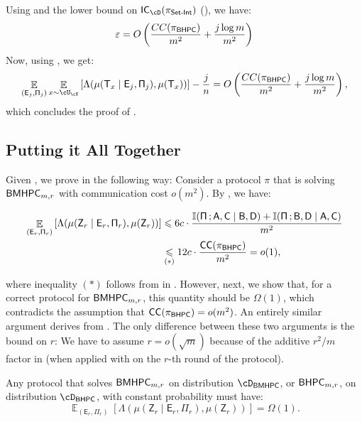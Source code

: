 \documentclass[11pt,letterpaper]{article}
\newcommand{\eps}{\varepsilon}
\DeclareMathOperator*{\E}{\mathbb{E}}
\renewcommand{\leq}{\leqslant}
\theoremstyle{definition}
\newcommand{\rPi}{\rv{\Pi}}
\DeclareMathOperator{\myCC}{\mathsf{CC}}
\newcommand{\bhpc}{\ensuremath{\textnormal{\textsf{BHPC}}}\xspace}
\newcommand{\bmhpc}{\ensuremath{\textnormal{\textsf{BMHPC}}}\xspace}
\newcommand{\rA}{\rv{A}}
\newcommand{\rB}{\rv{B}}
\newcommand{\rC}{\rv{C}}
\newcommand{\rD}{\rv{D}}
\newcommand{\rv}[1]{\ensuremath{\mathsf{#1}}}
\newcommand{\II}{\ensuremath{\mathbb{I}}}
\newcommand{\mi}[2]{\ensuremath{\II(#1 \,; #2)}}
\newcommand{\rZ}{\rv{Z}}
\newcommand{\rT}{\rv{T}}
\newcommand{\rE}{\rv{E}}
\newcommand{\SI}{\ensuremath{\textnormal{\textsf{Set-Int}}}\xspace}
\newcommand{\ICost}[2]{\ensuremath{\textnormal{\textsf{IC}}_{#2}(#1)}\xspace}
\begin{document}
\noindent
Using  and the lower bound on $\ICost{\pi_\SI}{\cD}$ (), we have:
\[
\eps = O\left(\frac{CC(\pi_\bhpc)}{m^2} + \frac{j \log m} {m^2}\right)
\]
Now, using , we get:
\[
\E_{(\rE_j, \rPi_j)}\E_{x \sim \cU_\cX} \left[\Lambda(\mu(\rT_x \mid \rE_j,
\rPi_j), \mu(\rT_x)) \right] - \frac j n = O\left(\frac{CC(\pi_\bhpc)}{m^2} + \frac{j \log m} {m^2}\right),
\]
which concludes the proof of .


\subsection{Putting it All Together}\label{sec:put-together}


 Given , we prove  in the following way:
 Consider a protocol $\pi$ that is solving $\bmhpc_{m,r}$ with communication
 cost $o(m^2)$.
 By , we have:

 \begin{align*}
     \E_{(\rE_r, \rPi_r)}\left[\Lambda(\mu(\rZ_r \mid \rE_r, \rPi_r), \mu(\rZ_r))\right]
     &\leq 6 c \cdot \frac{\mi{\rPi}{\rA,\rC \mid \rB,\rD} + \mi{\rPi}{\rB,\rD
\mid \rA,\rC}}{m^2}\\ &\underset{(\ast)}{\leq} 12c \cdot \frac{\myCC(\pi_\bhpc)}{m^2} = o(1),
 \end{align*}

where inequality $(\ast)$ follows from 
in .
However, next, we show that, for a correct protocol for $\bmhpc_{m,r}$, this
quantity should be $\Omega(1)$, which contradicts the assumption that
$\myCC(\pi_\bhpc) = o(m^2)$.
An entirely similar argument derives  from .
The only difference between these two arguments is the bound on $r$: We have to
assume $r = o(\sqrt{m})$ because of the additive $r^2/m$ factor in
 (when applied with on the $r$-th round of the protocol).




\begin{lemma} \label{lem:hpc-correctness}
    Any protocol that solves $\bmhpc_{m,r}$ on distribution $\cD_\bmhpc$, or $\bhpc_{m,r}$, on distribution $\cD_\bhpc$, with constant probability must have:
    \[
 \E_{(\rE_r, \rPi_r)}\left[\Lambda(\mu(\rZ_r \mid \rE_r, \rPi_r), \mu(\rZ_r))\right] = \Omega(1).
\]
\end{lemma}
\end{document}
